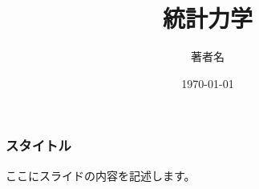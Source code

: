 \documentclass{beamer}
\title{統計力学}
\author{著者名}
\date{\customDate\today}
\begin{document}
\frame{\titlepage}

\begin{frame}
  \frametitle{スタイトル}
  ここにスライドの内容を記述します。
\end{frame}
\end{document}

